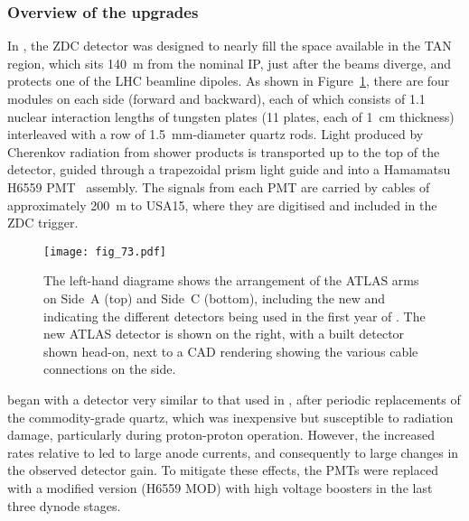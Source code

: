 \documentclass[cernpreprint, atlasdraft=false, UKenglish,british,orcidlogo, texmf, orcidlogo]{atlasdoc}
\begin{document}
\subsubsection{Overview of the  upgrades}
In \RunOneTwo, the \gls{ZDC} detector was designed to nearly fill the space
available in the \gls{TAN} region, which sits \SI{140}{\m} from the nominal
\gls{IP}, just after the beams diverge, and protects one
of the \gls{LHC} beamline dipoles.
As shown in Figure~\ref{fig:zdc_layout}, there are four modules on each side
(forward and backward), each of which consists of \num{1.1} nuclear
interaction lengths of tungsten plates (\num{11} plates, each of \SI{1}{\cm}
thickness) interleaved with a row of \SI{1.5}{\mm}-diameter quartz
rods.  Light produced by Cherenkov radiation from shower products is
transported up to the top of the detector, guided through a
trapezoidal prism light guide and into a Hamamatsu H6559 \gls{PMT}~\cite{zdc-pmt} assembly.
The signals from each \gls{PMT} are carried by cables of approximately
\SI{200}{\m} to \gls{USA15}, where they are digitised and included in the
\gls{ZDC} trigger.
\begin{figure}[t!]
\texttt{[image: fig\_73.pdf]}
\caption{The left-hand diagrame shows the arrangement of the ATLAS  arms on Side~A (top) and Side~C (bottom), including the new  and indicating the different  detectors being used in the first year of \RunThr. The new ATLAS  detector is shown on the right, with a built detector shown head-on, next to a CAD rendering showing the various cable connections on the side.}
\label{fig:zdc_layout}
\end{figure}
\RunTwo began with a detector very similar to that used in \RunOne, after
periodic replacements of the commodity-grade quartz, which was
inexpensive but susceptible to radiation damage, particularly during
proton-proton operation.  However, the increased rates relative to \RunOne
led to large anode currents, and consequently to large changes in the
observed detector gain.  To mitigate these effects, the \glspl{PMT} were replaced
with a modified version (H6559 MOD) with high voltage boosters in the
last three dynode stages.
 
\end{document}
